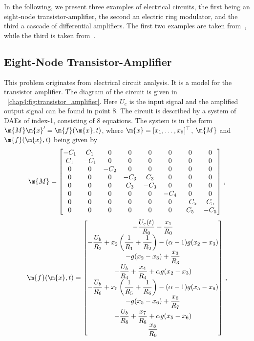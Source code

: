 In the following, we present three examples of electrical circuits, the first being an eight-node transistor-amplifier, the second an electric ring modulator, and the third a cascade of differential amplifiers. The first two examples are taken from~\cite{lioen1998test, mazzia2008test}, while the third is taken from~\cite{brenan1995numerical}.

\subsection{Eight-Node Transistor-Amplifier}

This problem originates from electrical circuit analysis. It is a model for the transistor amplifier. The diagram of the circuit is given in \figurename{}~\ref{chap4:fig:transistor_amplifier}. Here $U_e$ is the input signal and the amplified output signal can be found in point $8$. The circuit is described by a system of \acp{DAE} of index-1, consisting of 8 equations. The system is in the form $\m{M}\m{x}^\prime = \m{f}(\m{x},t)$, where $\m{x} = [x_1, \dots, x_8]^\top$, $\m{M}$ and $\m{f}(\m{x},t)$ being given by
%
\begin{equation}
  \m{M} = \begin{bmatrix}
    -C_1 & C_1 & 0 & 0 & 0 & 0 & 0 & 0 \\
    C_1 & -C_1 & 0 & 0 & 0 & 0 & 0 & 0 \\
    0 & 0 & -C_2 & 0 & 0 & 0 & 0 & 0 \\
    0 & 0 & 0 & -C_3 & C_3 & 0 & 0 & 0 \\
    0 & 0 & 0 & C_3 & -C_3 & 0 & 0 & 0 \\
    0 & 0 & 0 & 0 & 0 & -C_4 & 0 & 0 \\
    0 & 0 & 0 & 0 & 0 & 0 & -C_5 & C_5 \\
    0 & 0 & 0 & 0 & 0 & 0 & C_5 & -C_5
  \end{bmatrix} \, \text{,}
\end{equation}
%
\begin{equation}
  \m{f}(\m{x},t) = \begin{bmatrix}
    -\dfrac{U_e(t)}{R_0} + \dfrac{x_1}{R_0} \\
    -\dfrac{U_b}{R_2} + x_2\left(\dfrac{1}{R_1}+\dfrac{1}{R_2}\right) - (\alpha-1)g(x_2-x_3) \\
    -g(x_2-x_3)+\dfrac{x_3}{R_3} \\
    -\dfrac{U_b}{R_4} + \dfrac{x_4}{R_4} + \alpha g(x_2-x_3) \\
    -\dfrac{U_b}{R_6} + x_5\left(\dfrac{1}{R_5} + \dfrac{1}{R_6}\right)-(\alpha-1) g(x_5-x_6) \\
    -g(x_5-x_6) + \dfrac{x_6}{R_7} \\
    -\dfrac{U_b}{R_8} + \dfrac{x_7}{R_8} + \alpha g(x_5-x_6) \\
    \dfrac{x_8}{R_9}
  \end{bmatrix} \, \text{,}
\end{equation}
